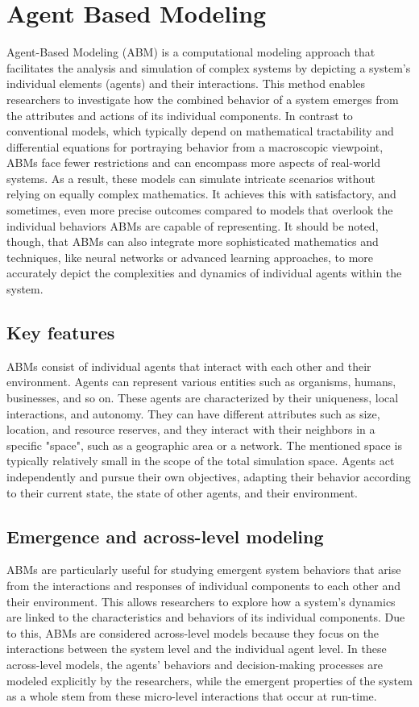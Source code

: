 \section{Agent Based Modeling}
    Agent-Based Modeling (ABM) is a computational modeling approach that facilitates the analysis and simulation of complex systems by depicting a system's individual elements (agents) and their interactions\cite{railsback2019agent}. This method enables researchers to investigate how the combined behavior of a system emerges from the attributes and actions of its individual components. In contrast to conventional models, which typically depend on mathematical tractability and differential equations for portraying behavior from a macroscopic viewpoint, ABMs face fewer restrictions and can encompass more aspects of real-world systems\cite{bonabeau2002agent}. As a result, these models can simulate intricate scenarios without relying on equally complex mathematics. It achieves this with satisfactory, and sometimes, even more precise outcomes compared to models that overlook the individual behaviors ABMs are capable of representing. It should be noted, though, that ABMs can also integrate more sophisticated mathematics and techniques, like neural networks or advanced learning approaches, to more accurately depict the complexities and dynamics of individual agents within the system.

\subsection{Key features}
    ABMs consist of individual agents that interact with each other and their environment. Agents can represent various entities such as organisms, humans, businesses, and so on. These agents are characterized by their uniqueness, local interactions, and autonomy. They can have different attributes such as size, location, and resource reserves, and they interact with their neighbors in a specific "space", such as a geographic area or a network\cite{railsback2019agent}. The mentioned space is typically relatively small in the scope of the total simulation space. Agents act independently and pursue their own objectives, adapting their behavior according to their current state, the state of other agents, and their environment.

\subsection{Emergence and across-level modeling}
    ABMs are particularly useful for studying emergent system behaviors that arise from the interactions and responses of individual components to each other and their environment. This allows researchers to explore how a system's dynamics are linked to the characteristics and behaviors of its individual components. Due to this, ABMs are considered across-level models because they focus on the interactions between the system level and the individual agent level\cite{railsback2019agent}. In these across-level models, the agents' behaviors and decision-making processes are modeled explicitly by the researchers, while the emergent properties of the system as a whole stem from these micro-level interactions that occur at run-time.

